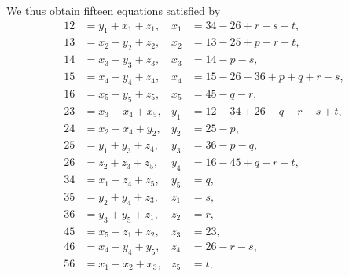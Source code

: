 \documentclass[11pt]{article}
\begin{document}
We thus obtain fifteen equations satisfied by
\begin{align*}
12 &= y_{1} + x_{1} + z_{1}, & x_{1} &= 34 - 26 + r + s - t, \\
13 &= x_{2} + y_{2} + z_{2}, & x_{2} &= 13 - 25 + p - r + t, \\
14 &= x_{3} + y_{3} + z_{3}, & x_{3} &= 14 - p - s, \\
15 &= x_{4} + y_{4} + z_{4}, & x_{4} &= 15 - 26 - 36 + p + q + r - s, \\
16 &= x_{5} + y_{5} + z_{5}, & x_{5} &= 45 - q - r, \\
23 &= x_{3} + x_{4} + x_{5}, & y_{1} &= 12 - 34 + 26 - q - r - s + t, \\
24 &= x_{2} + x_{4} + y_{2}, & y_{2} &= 25 - p, \\
25 &= y_{1} + y_{3} + z_{4}, & y_{3} &= 36 - p - q, \\
26 &= z_{2} + z_{3} + z_{5}, & y_{4} &= 16 - 45 + q + r - t, \\
34 &= x_{1} + z_{4} + z_{5}, & y_{5} &= q, \\
35 &= y_{2} + y_{4} + z_{3}, & z_{1} &= s, \\
36 &= y_{3} + y_{5} + z_{1}, & z_{2} &= r, \\
45 &= x_{5} + z_{1} + z_{2}, & z_{3} &= 23, \\
46 &= x_{4} + y_{4} + y_{5}, & z_{4} &= 26 - r - s, \\
56 &= x_{1} + x_{2} + x_{3}, & z_{5} &= t,
\end{align*}
\end{document}
